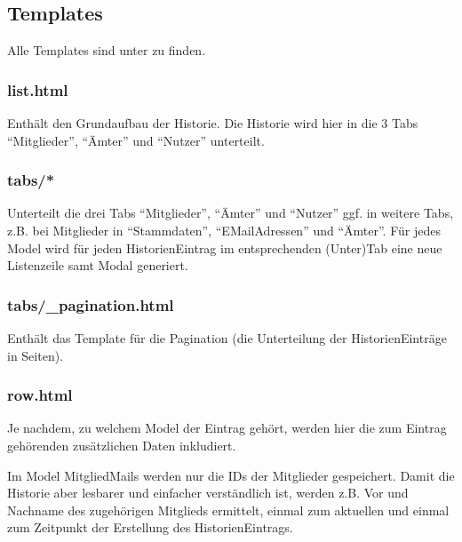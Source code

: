 \documentclass[letterpaper,10pt,english]{sphinxmanual}
\begin{document}
\subsection{Templates}
\label{\detokenize{masterCodeDoc:id4}}
Alle Templates sind unter  zu finden.


\subsubsection{list.html}
\label{\detokenize{masterCodeDoc:list-html}}
Enthält den Grundaufbau der Historie. Die Historie wird hier in die 3 Tabs “Mitglieder”, “Ämter” und “Nutzer” unterteilt.


\subsubsection{tabs/*}
\label{\detokenize{masterCodeDoc:tabs}}
Unterteilt die drei Tabs “Mitglieder”, “Ämter” und “Nutzer” ggf. in weitere Tabs, z.B. bei Mitglieder in “Stammdaten”, “E\sphinxhyphen{}Mail\sphinxhyphen{}Adressen” und “Ämter”.
Für jedes Model wird für jeden Historien\sphinxhyphen{}Eintrag im entsprechenden (Unter\sphinxhyphen{})Tab eine neue Listenzeile samt Modal generiert.


\subsubsection{tabs/\_pagination.html}
\label{\detokenize{masterCodeDoc:tabs-pagination-html}}
Enthält das Template für die Pagination (die Unterteilung der Historien\sphinxhyphen{}Einträge in Seiten).


\subsubsection{row.html}
\label{\detokenize{masterCodeDoc:row-html}}
\begin{DUlineblock}{0em}
\item[] Je nachdem, zu welchem Model der Eintrag gehört, werden hier die zum Eintrag gehörenden zusätzlichen Daten inkludiert.
\end{DUlineblock}

\begin{DUlineblock}{0em}
\item[]  Im Model MitgliedMails werden nur die IDs der Mitglieder gespeichert. Damit die Historie aber lesbarer und einfacher verständlich ist,
werden z.B. Vor\sphinxhyphen{} und Nachname des zugehörigen Mitglieds ermittelt, einmal zum aktuellen und einmal zum Zeitpunkt der Erstellung des Historien\sphinxhyphen{}Eintrags.
\end{DUlineblock}
\end{document}
